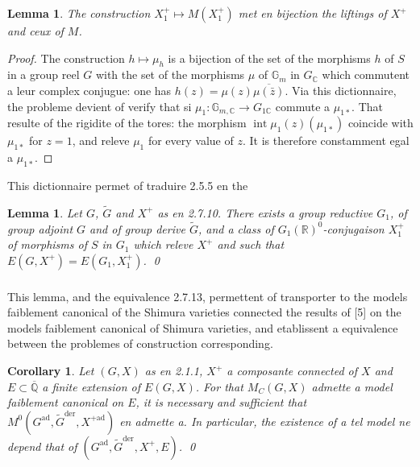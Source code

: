\documentclass[12pt,a4paper]{article}
\theoremstyle{plain}
\newtheorem{lemma}[theorem]{Lemma}
\newtheorem{corollary}[theorem]{Corollary}
\theoremstyle{definition}
\theoremstyle{remark}
\DeclareMathOperator{\Int}{int}
\newcommand{\QQ}{\mathbb{Q}}
\newcommand{\RR}{\mathbb{R}}
\newcommand{\CC}{\mathbb{C}}
\newcommand{\Gm}{\mathbb{G}}
\begin{document}
\begin{lemma}
The construction $X_1^+ \mapsto M(X_1^+)$ met en bijection the liftings of $X^+$ and ceux of $M$.
\end{lemma}

\begin{proof}
The construction $h \mapsto \mu_h$ is a bijection of the set of the morphisms $h$ of $S$ in a group reel $G$ with the set of the morphisms $\mu$ of $\Gm_m$ in $G_{\CC}$ which commutent a leur complex conjugue: one has $h(z) = \mu(z)\overline{\mu(\bar{z})}$. Via this dictionnaire, the probleme devient of verify that si $\mu_1: \Gm_{m,\CC} \to G_{1\CC}$ commute a $\mu_{1*}$. That resulte of the rigidite of the tores: the morphism $\Int\mu_1(z)(\mu_{1*})$ coincide with $\mu_{1*}$ for $z=1$, and releve $\mu_1$ for every value of $z$. It is therefore constamment egal a $\mu_{1*}$.
\end{proof}

This dictionnaire permet of traduire 2.5.5 en the

\begin{lemma}
Let $G$, $\tilde{G}$ and $X^+$ as en 2.7.10. There exists a group reductive $G_1$, of group adjoint $G$ and of group derive $\tilde{G}$, and a class of $G_1(\RR)^0$-conjugaison $X_1^+$ of morphisms of $S$ in $G_1$ which releve $X^+$ and such that $E(G,X^+) = E(G_1,X_1^+)$.
\qed
\end{lemma}

\subsubsection{}

This lemma, and the equivalence 2.7.13, permettent of transporter to the models faiblement canonical of the Shimura varieties connected the results of [5] on the models faiblement canonical of Shimura varieties, and etablissent a equivalence between the problemes of construction corresponding.

\begin{corollary}
Let $(G,X)$ as en 2.1.1, $X^+$ a composante connected of $X$ and $E \subset \overline{\QQ}$ a finite extension of $E(G,X)$. For that $M_C(G,X)$ admette a model faiblement canonical on $E$, it is necessary and sufficient that $M^0(G^{\text{ad}}, \tilde{G}^{\text{der}}, X^{+\text{ad}})$ en admette a. In particular, the existence of a tel model ne depend that of $(G^{\text{ad}}, \tilde{G}^{\text{der}}, X^+, E)$.
\qed
\end{corollary}
\end{document}
